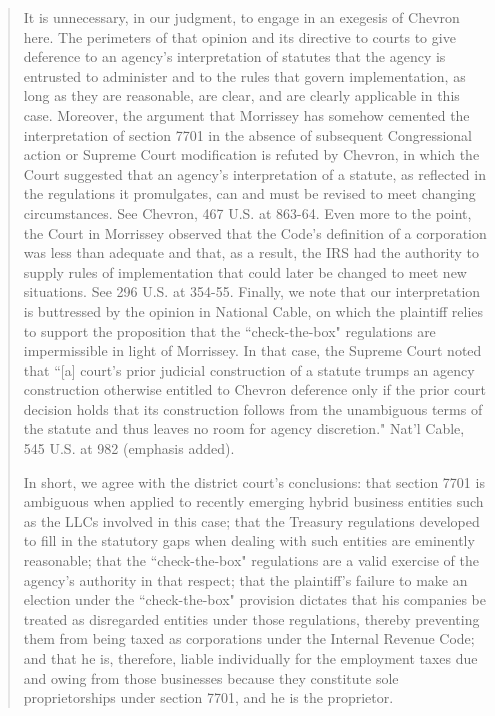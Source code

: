 \begin{enumerate}
\begin{quote}
It is unnecessary, in our judgment, to engage in an exegesis of Chevron here. The perimeters of that opinion and its directive to courts to give deference to an agency's interpretation of statutes that the agency is entrusted to administer and to the rules that govern implementation, as long as they are reasonable, are clear, and are clearly applicable in this case. Moreover, the argument that Morrissey has somehow cemented the interpretation of section 7701 in the absence of subsequent Congressional action or Supreme Court modification is refuted by Chevron, in which the Court suggested that an agency's interpretation of a statute, as reflected in the regulations it promulgates, can and must be revised to meet changing circumstances. See Chevron, 467 U.S. at 863-64. Even more to the point, the Court in Morrissey observed that the Code's definition of a corporation was less than adequate and that, as a result, the IRS had the authority to supply rules of implementation that could later be changed to meet new situations. See 296 U.S. at 354-55. Finally, we note that our interpretation is buttressed by the opinion in National Cable, on which the plaintiff relies to support the proposition that the ``check-the-box" regulations are impermissible in light of Morrissey. In that case, the Supreme Court noted that ``[a] court's prior judicial construction of a statute trumps an agency construction otherwise entitled to Chevron deference only if the prior court decision holds that its construction follows from the unambiguous terms of the statute and thus leaves no room for agency discretion." Nat'l Cable, 545 U.S. at 982 (emphasis added).

In short, we agree with the district court's conclusions: that section 7701 is ambiguous when applied to recently emerging hybrid business entities such as the LLCs involved in this case; that the Treasury regulations developed to fill in the statutory gaps when dealing with such entities are eminently reasonable; that the ``check-the-box" regulations are a valid exercise of the agency's authority in that respect; that the plaintiff's failure to make an election under the ``check-the-box" provision dictates that his companies be treated as disregarded entities under those regulations, thereby preventing them from being taxed as corporations under the Internal Revenue Code; and that he is, therefore, liable individually for the employment taxes due and owing from those businesses because they constitute sole proprietorships under section 7701, and he is the proprietor.
		\end{quote}
		

\end{enumerate}

